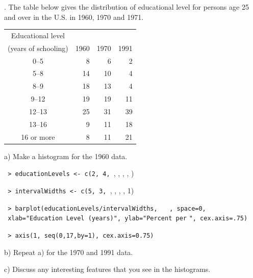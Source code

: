 \documentclass[10pt]{article}
\newcommand{\U}{\underline{\hspace{5pt}}}
\newcounter{EX}\setcounter{EX}{1}
\newcommand{\EXERCISE}{\arabic{EX}.\stepcounter{EX} }
\begin{document}
\EXERCISE The table below gives the distribution of educational level 
for persons age 25 and over  in the U.S. in 1960, 1970 and 1971.  \vspace{-10pt}
\begin{center}
\begin{tabular}{crrr}
Educational level \\
(years of schooling) & 1960 & 1970 & 1991\\
0--5 & 8 & 6 & 2\\
5--8 & 14 & 10 & 4\\
8--9 & 18 & 13 & 4\\
9--12 & 19 & 19 & 11\\
12--13 & 25 & 31 & 39\\
13--16 & 9 & 11 & 18\\
16 or more & 8 & 11 & 21
\end{tabular}
\end{center}

\renewcommand{\U}{\underline{\hspace{10pt}}}


\SUBX a) Make a histogram
for the 1960 data.

\texttt{ > educationLevels <- c(2, 4, }\U, \U, \U, \U, \U)\par
\texttt{ > intervalWidths  <- c(5, 3, }\U, \U, \U, \U, 1)\par
\texttt{ > barplot(educationLevels/intervalWidths, } \U\U\U\U\U\U\ %
    \texttt{, space=0,}\\ 
{\hbox{\hspace{15pt}}}\texttt{ xlab="Education Level (years)", ylab="Percent per} \U\U\U
   \texttt{", cex.axis=.75)}\par
\texttt{ > axis(1, seq(0,17,by=1), cex.axis=0.75)}\par
\medskip

\SUBX b) Repeat a) for the 1970 and 1991 data.

\SUBX c) Discuss any interesting
features that you see in the histograms.



\vfill
\eject
\end{document}
